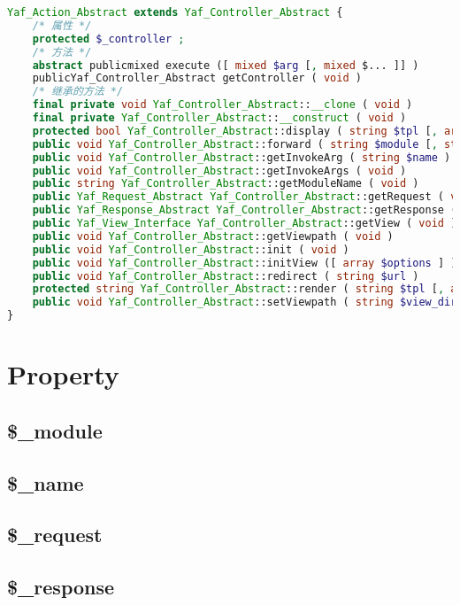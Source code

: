 \begin{lstlisting}[language=PHP]
Yaf_Action_Abstract extends Yaf_Controller_Abstract {
    /* 属性 */
    protected $_controller ;
    /* 方法 */
    abstract publicmixed execute ([ mixed $arg [, mixed $... ]] )
    publicYaf_Controller_Abstract getController ( void )
    /* 继承的方法 */
    final private void Yaf_Controller_Abstract::__clone ( void )
    final private Yaf_Controller_Abstract::__construct ( void )
    protected bool Yaf_Controller_Abstract::display ( string $tpl [, array $parameters ] )
    public void Yaf_Controller_Abstract::forward ( string $module [, string $controller [, string $action [, array $paramters ]]] )
    public void Yaf_Controller_Abstract::getInvokeArg ( string $name )
    public void Yaf_Controller_Abstract::getInvokeArgs ( void )
    public string Yaf_Controller_Abstract::getModuleName ( void )
    public Yaf_Request_Abstract Yaf_Controller_Abstract::getRequest ( void )
    public Yaf_Response_Abstract Yaf_Controller_Abstract::getResponse ( void )
    public Yaf_View_Interface Yaf_Controller_Abstract::getView ( void )
    public void Yaf_Controller_Abstract::getViewpath ( void )
    public void Yaf_Controller_Abstract::init ( void )
    public void Yaf_Controller_Abstract::initView ([ array $options ] )
    public void Yaf_Controller_Abstract::redirect ( string $url )
    protected string Yaf_Controller_Abstract::render ( string $tpl [, array $parameters ] )
    public void Yaf_Controller_Abstract::setViewpath ( string $view_directory )
}
\end{lstlisting}

\section{Property}


\subsection{\$\_module}


\subsection{\$\_name}


\subsection{\$\_request}


\subsection{\$\_response}


